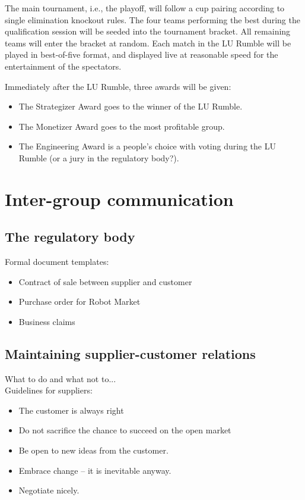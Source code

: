 \documentclass{scrreprt}
\begin{document}
The main tournament, i.e., the playoff, will follow a cup pairing according to single elimination knockout rules. The four teams performing the best during the qualification session will be seeded into the tournament bracket. All remaining teams will enter the bracket at random. Each match in the LU Rumble will be played in best-of-five format, and displayed live at reasonable speed for the entertainment of the spectators.

Immediately after the LU Rumble, three awards will be given:
\begin{itemize}
\item The Strategizer Award goes to the winner of the LU Rumble.
\item The Monetizer Award goes to the most profitable group.
\item The Engineering Award is a people's choice with voting during the LU Rumble (or a jury in the regulatory body?).
\end{itemize}

\chapter{Inter-group communication}

\section{The regulatory body} \label{sec:regbody}
Formal document templates:

\begin{itemize}
\item Contract of sale between supplier and customer
\item Purchase order for Robot Market
\item Business claims
\end{itemize}

\section{Maintaining supplier-customer relations}
What to do and what not to...\\

Guidelines for suppliers:
\begin{itemize}
\item The customer is always right
\item Do not sacrifice the chance to succeed on the open market
\item Be open to new ideas from the customer.
\item Embrace change -- it is inevitable anyway.
\item Negotiate nicely.
\end{itemize}
\end{document}
